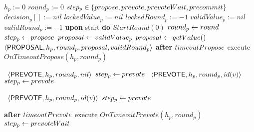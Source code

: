 \begin{algorithm}[htb!]
\def\baselinestretch{1}
\scriptsize\raggedright
\begin{algorithmic}[1]
	\SHORTSPACE
\INIT{}
\STATE $h_p := 0$ 
\STATE $round_p := 0$    
\STATE $step_p  \in \left\{propose, prevote, prevoteWait, precommit\right\}$ 
\STATE $decision_p[] := nil$ 
\STATE $lockedValue_p := nil$
\STATE $lockedRound_p := -1$ 
\STATE $validValue_p := nil$
\STATE $validRound_p := -1$
\ENDINIT
\SHORTSPACE
\STATE \textbf{upon} start \textbf{do}  $StartRound(0)$
\SHORTSPACE
{} \label{line:tab:startRound}
	\STATE	$round_p \leftarrow round$
	\STATE	$step_p \leftarrow propose$
		 \label{line:tab:isThereLockedValue}
			\STATE $proposal \leftarrow validValue_p$
		\ELSE
			\STATE $proposal \leftarrow getValue()$ \label{line:tab:getValidValue}
		\ENDIF 	  
		\STATE \Broadcast\ $\langle\mathsf{PROPOSAL},h_p, round_p, proposal, validRound_p\rangle$  \label{line:tab:send-proposal}
	\ELSE
		\STATE \textbf{after} $timeoutPropose$ execute $OnTimeoutPropose(h_p, round_p)$ 
	\ENDIF
\ENDFUNCTION

\SPACE
{} \label{line:tab:recvProposal}			
   \label{line:tab:acceptProposal1}		
 	\STATE \Broadcast \ $\langle\mathsf{PREVOTE},h_p,round_p,nil\rangle$  \label{line:tab:prevote-nil}	
 	\STATE $step_p \leftarrow prevote$ \label{line:tab:setStateToPrevote1} 
  \label{line:tab:accept-proposal-2}
 	\STATE \Broadcast \ $\langle\mathsf{PREVOTE},h_p,round_p,id(v)\rangle$  \label{line:tab:prevote-proposal}	
 	\STATE $step_p \leftarrow prevote$ \label{line:tab:setStateToPrevote2} 
 \ENDIF
\ENDUPON

\SPACE
{} \label{line:tab:acceptProposal}
	 \label{line:tab:cond-prevote-higher-proposal}	
		\STATE \Broadcast \ $\langle\mathsf{PREVOTE},h_p,round_p,id(v)\rangle$  \label{line:tab:prevote-higher-proposal}	
		\STATE $step_p \leftarrow prevote$ \label{line:tab:setStateToPrevote3} 		 
	\ENDIF
\ENDUPON

\SPACE
{} \label{line:tab:recvAny2/3Prevote}
	\STATE \textbf{after} $timeoutPrevote$ execute $OnTimeoutPrevote(h_p, round_p)$ \label{line:tab:timeoutPrevote}
		\STATE $step_p \leftarrow prevoteWait$ \label{line:tab:setStateToPrevoteWait} 
\ENDUPON


\end{algorithmic}
\end{algorithm}
